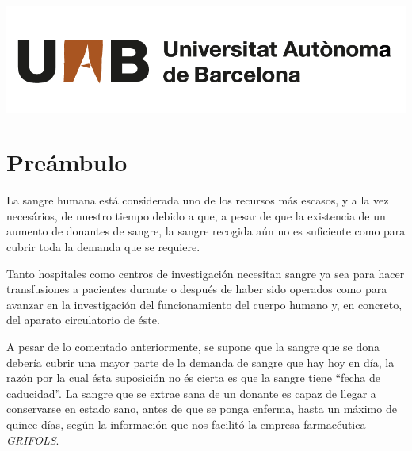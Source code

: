 \documentclass[a4paper,11pt,twoside]{report}\usepackage[]{graphicx}\usepackage[]{color}
\newcommand{\breakline}{\par\vspace{0.2cm}}
\begin{document}

















\begin{titlepage}


\begin{minipage}{0.48\textwidth}\raggedright
\includegraphics[width=\textwidth]{images/UAB.png}
\end{minipage}
\end{titlepage}

\dominitoc

\clearpage


\setcounter{tocdepth}{1}
\tableofcontents

\listoffigures

\listoftables



\chapter{Preámbulo}
\label{chap:preamble}

\minitoc
\vspace{0.1cm}
La sangre humana está considerada uno de los recursos más escasos, y a la vez necesários, de nuestro tiempo debido a que, a pesar de que la existencia de un aumento de donantes de sangre, la sangre recogida aún no es suficiente como para cubrir toda la demanda que se requiere. \breakline 
Tanto hospitales como centros de investigación necesitan sangre ya sea para hacer transfusiones a pacientes durante o después de haber sido operados como para avanzar en la investigación del funcionamiento del cuerpo humano y, en concreto, del aparato circulatorio de éste. \breakline
A pesar de lo comentado anteriormente, se supone que la sangre que se dona debería cubrir una mayor parte de la demanda de sangre que hay hoy en día, la razón por la cual ésta suposición no és cierta es que la sangre tiene ``fecha de caducidad''. La sangre que se extrae sana de un donante es capaz de llegar a conservarse en estado sano, antes de que se ponga enferma, hasta un máximo de quince días, según la información que nos facilitó la empresa farmacéutica \textsl{GRIFOLS}. \breakline
\end{document}
